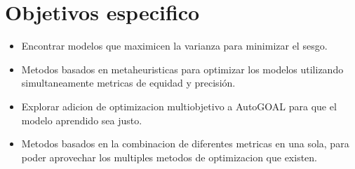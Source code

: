 \section*{Objetivos especifico}

\begin{itemize}
    \item Encontrar modelos que maximicen la varianza para minimizar el sesgo.
    \item Metodos basados en metaheuristicas para optimizar los modelos utilizando simultaneamente metricas de equidad y precisión.
    \item Explorar adicion de optimizacion multiobjetivo a AutoGOAL para que el modelo aprendido sea justo.
    \item Metodos basados en la combinacion de diferentes metricas en una sola, para poder aprovechar los multiples metodos de optimizacion que existen.
\end{itemize}

